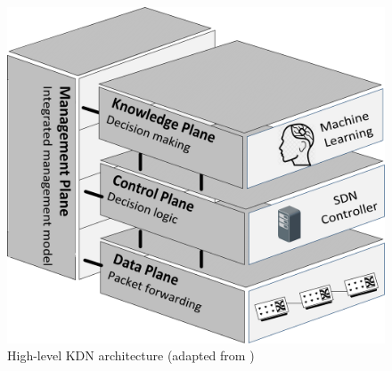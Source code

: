 \begin{figure}[!ht]
    \centering
    \includegraphics[scale=0.1]{figures/Figure1-KDN-architectured-3d.pdf}
    \caption{High-level KDN architecture (adapted from \cite{mestres_2017:KDN})}
    \label{fig:kdn_architecture}
\end{figure}

